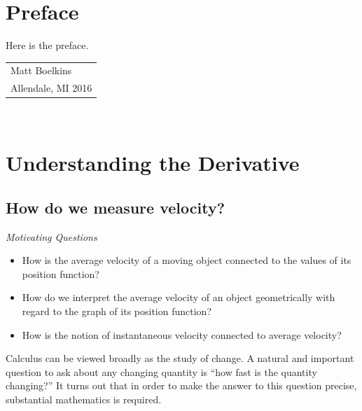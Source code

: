 \documentclass[10pt,]{book}
\theoremstyle{plain}
\theoremstyle{definition}
\theoremstyle{definition}
\theoremstyle{definition}
\theoremstyle{definition}
\theoremstyle{definition}
\numberwithin{equation}{section}
\begin{document}
\chapter*{Preface}\label{preface-1}
Here is the preface.%
\par\hfill\begin{tabular}{l@{}}
Matt Boelkins\\
Allendale, MI 2016
\end{tabular}\\\par
\setcounter{tocdepth}{1}
\renewcommand*\contentsname{Contents}
\tableofcontents
\mainmatter
\typeout{************************************************}
\typeout{************************************************}
\chapter[{Understanding the Derivative}]{Understanding the Derivative}\label{C-1}
\typeout{************************************************}
\typeout{************************************************}
\section[{How do we measure velocity?}]{How do we measure velocity?}\label{sec-1-1-vel}
\typeout{************************************************}
\typeout{************************************************}

\emph{Motivating Questions}
%
\leavevmode%
\begin{itemize}[label=\textbullet]
\item{}How is the average velocity of a moving object connected to the values of its position function?%
\item{}How do we interpret the average velocity of an object geometrically with regard to the graph of its position function?%
\item{}How is the notion of instantaneous velocity connected to average velocity?%
\end{itemize}
\par

%
\par

Calculus can be viewed broadly as the study of change. A natural and important question to ask about any changing quantity is ``how fast is the quantity changing?'' It turns out that in order to make the answer to this question precise, substantial mathematics is required.
%
\par
\end{document}
